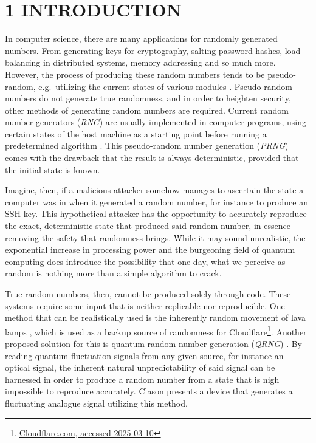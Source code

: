 \hypertarget{introduction}{%
\section{1 INTRODUCTION}\label{introduction}}

In computer science, there are many applications for randomly generated numbers. From generating keys for cryptography, salting password hashes, load balancing in distributed systems, memory addressing and so much more. However, the process of producing these random numbers tends to be pseudo-random, e.g.~utilizing the current states of various modules \cite{randomness}. Pseudo-random numbers do not generate true randomness, and in order to heighten security, other methods of generating random numbers are required. Current random number generators (\emph{RNG}) are usually implemented in computer programs, using certain states of the host machine as a starting point before running a predetermined algorithm \cite{randomness}. This pseudo-random number generation (\emph{PRNG}) comes with the drawback that the result is always deterministic, provided that the initial state is known.

Imagine, then, if a malicious attacker somehow manages to ascertain the state a computer was in when it generated a random number, for instance to produce an SSH-key. This hypothetical attacker has the opportunity to accurately reproduce the exact, deterministic state that produced said random number, in essence removing the safety that randomness brings. While it may sound unrealistic, the exponential increase in processing power and the burgeoning field of quantum computing does introduce the possibility that one day, what we perceive as random is nothing more than a simple algorithm to crack.

True random numbers, then, cannot be produced solely through code. These systems require some input that is neither replicable nor reproducible. One method that can be realistically used is the inherently random movement of lava lamps \cite{lavarand}, which is used as a backup source of randomness for Cloudflare\footnote{\href{https://blog.cloudflare.com/randomness-101-lavarand-in-production/}{Cloudflare.com, accessed 2025-03-10}}. Another proposed solution for this is quantum random number generation (\emph{QRNG}) \cite{QRNG}. By reading quantum fluctuation signals from any given source, for instance an optical signal, the inherent natural unpredictability of said signal can be harnessed in order to produce a random number from a state that is nigh impossible to reproduce accurately. Clason \cite{Clason2023} presents a device that generates a fluctuating analogue signal utilizing this method.


